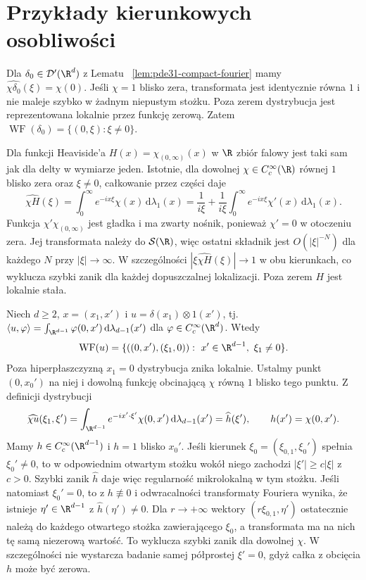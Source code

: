 \section{Przykłady kierunkowych osobliwości}
\begin{przyklad}\label{ex:pde31-delta}
Dla $\delta_0\in\mathcal D'(\R^d)$ z Lematu
~\ref{lem:pde31-compact-fourier} mamy
$\widehat{\chi\delta_0}(\xi)=\chi(0)$.
Jeśli $\chi=1$ blisko zera, transformata jest
identycznie równa $1$ i nie maleje szybko w żadnym
niepustym stożku. Poza zerem dystrybucja jest
reprezentowana lokalnie przez funkcję zerową.
Zatem $\operatorname{WF}(\delta_0)=\{(0,\xi):\xi\ne0\}$.

Dla funkcji Heaviside'a $H(x)=\chi_{(0,\infty)}(x)$
w $\R$ zbiór falowy jest taki sam jak dla delty
w wymiarze jeden. Istotnie, dla dowolnej
$\chi\in C_c^\infty(\R)$ równej $1$ blisko zera
oraz $\xi\ne0$, całkowanie przez części daje
\[
 \widehat{\chi H}(\xi)
 =\int_0^\infty e^{-ix\xi}\chi(x)\,\mathrm d\lambda_1(x)
 =\frac{1}{i\xi}+
 \frac{1}{i\xi}\int_0^\infty e^{-ix\xi}\chi'(x)
 \,\mathrm d\lambda_1(x).
\]
Funkcja $\chi'\chi_{(0,\infty)}$ jest gładka
i ma zwarty nośnik, ponieważ $\chi'=0$
w otoczeniu zera. Jej transformata należy do
$\mathcal S(\R)$, więc ostatni składnik jest
$O(|\xi|^{-N})$ dla każdego $N$ przy $|\xi|\to\infty$.
W szczególności $|\xi\widehat{\chi H}(\xi)|\to1$
w obu kierunkach, co wyklucza szybki zanik
dla każdej dopuszczalnej lokalizacji.
Poza zerem $H$ jest lokalnie stała.
\end{przyklad}

\begin{przyklad}\label{ex:pde31-conormal}
Niech $d\ge2$, $x=(x_1,x')$ i
$u=\delta(x_1)\otimes1(x')$, tj.
$\langle u,\varphi\rangle=\int_{\R^{d-1}}\varphi(0,x')
\,\mathrm d\lambda_{d-1}(x')$ dla $\varphi\in C_c^\infty(\R^d)$.
Wtedy
\[
 \operatorname{WF}(u)=
 \{((0,x'),(\xi_1,0)):\ x'\in\R^{d-1},\ \xi_1\ne0\}.
\]
Poza hiperpłaszczyzną $x_1=0$ dystrybucja znika
lokalnie. Ustalmy punkt $(0,x_0')$ na niej
i dowolną funkcję obcinającą $\chi$ równą $1$
blisko tego punktu. Z definicji dystrybucji
\[
 \widehat{\chi u}(\xi_1,\xi')
 =\int_{\R^{d-1}} e^{-ix'\cdot\xi'}\chi(0,x')
 \,\mathrm d\lambda_{d-1}(x')
 =\widehat h(\xi'),\qquad h(x')=\chi(0,x').
\]
Mamy $h\in C_c^\infty(\R^{d-1})$ i $h=1$
blisko $x_0'$. Jeśli kierunek $\xi_0=(\xi_{0,1},\xi_0')$
spełnia $\xi_0'\ne0$, to w odpowiednim otwartym
stożku wokół niego zachodzi $|\xi'|\ge c|\xi|$
z $c>0$. Szybki zanik $\widehat h$ daje więc
regularność mikrolokalną w tym stożku.
Jeśli natomiast $\xi_0'=0$, to z $h\not\equiv0$
i odwracalności transformaty Fouriera wynika,
że istnieje $\eta'\in\R^{d-1}$ z
$\widehat h(\eta')\ne0$. Dla $r\to+\infty$
wektory $(r\xi_{0,1},\eta')$ ostatecznie należą
do każdego otwartego stożka zawierającego $\xi_0$,
a transformata ma na nich tę samą niezerową wartość.
To wyklucza szybki zanik dla dowolnej $\chi$.
W szczególności nie wystarcza badanie samej półprostej
$\xi'=0$, gdyż całka z obcięcia $h$ może być zerowa.
\end{przyklad}


